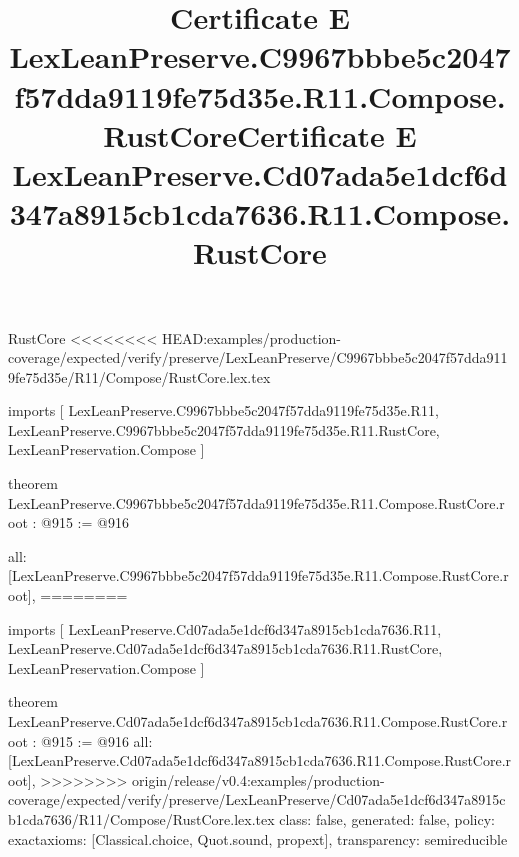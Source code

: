 \begin{lexlean}{RustCore}
<<<<<<<< HEAD:examples/production-coverage/expected/verify/preserve/LexLeanPreserve/C9967bbbe5c2047f57dda9119fe75d35e/R11/Compose/RustCore.lex.tex
\title{Certificate E LexLeanPreserve.C9967bbbe5c2047f57dda9119fe75d35e.R11.Compose.RustCore}
\begin{coremodule}
imports [
  LexLeanPreserve.C9967bbbe5c2047f57dda9119fe75d35e.R11,
  LexLeanPreserve.C9967bbbe5c2047f57dda9119fe75d35e.R11.RustCore,
  LexLeanPreservation.Compose
]

theorem LexLeanPreserve.C9967bbbe5c2047f57dda9119fe75d35e.R11.Compose.RustCore.root : @915 := @916 {
  all: [LexLeanPreserve.C9967bbbe5c2047f57dda9119fe75d35e.R11.Compose.RustCore.root],
========
\title{Certificate E LexLeanPreserve.Cd07ada5e1dcf6d347a8915cb1cda7636.R11.Compose.RustCore}
\begin{coremodule}
imports [
  LexLeanPreserve.Cd07ada5e1dcf6d347a8915cb1cda7636.R11,
  LexLeanPreserve.Cd07ada5e1dcf6d347a8915cb1cda7636.R11.RustCore,
  LexLeanPreservation.Compose
]

theorem LexLeanPreserve.Cd07ada5e1dcf6d347a8915cb1cda7636.R11.Compose.RustCore.root : @915 := @916 {
  all: [LexLeanPreserve.Cd07ada5e1dcf6d347a8915cb1cda7636.R11.Compose.RustCore.root],
>>>>>>>> origin/release/v0.4:examples/production-coverage/expected/verify/preserve/LexLeanPreserve/Cd07ada5e1dcf6d347a8915cb1cda7636/R11/Compose/RustCore.lex.tex
  class: false,
  generated: false,
  policy: exact{axioms: [Classical.choice, Quot.sound, propext]},
  transparency: semireducible
}


\end{coremodule}}
\end{coremodule}
\end{lexlean}
